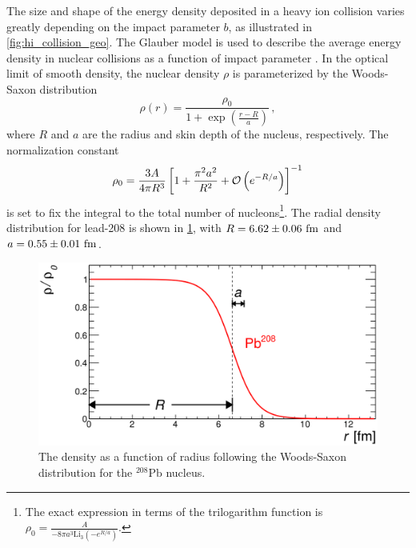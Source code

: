The size and shape of the energy density deposited in a heavy ion collision varies greatly depending on the impact parameter $b$, as illustrated in \cref{fig:hi_collision_geo}.
The Glauber model is used to describe the average energy density in nuclear collisions as a function of impact parameter \cite{Miller:2007ri}.
In the optical limit of smooth density, the nuclear density $\rho$ is parameterized by the Woods-Saxon distribution
\begin{equation}
\rho(r) = \frac{\rho_0}{1 + \exp\left( \frac{r-R}{a} \right)} \, ,
\end{equation}
where $R$ and $a$ are the radius and skin depth of the nucleus, respectively.
The normalization constant \[\rho_0 = \frac{3A}{4 \pi R^3} \left[1 + \frac{\pi^2 a^2}{R^2}  + \mathcal{O}\left( e^{-R/a} \right)\right]^{-1}\] is set to fix the integral to the total number of nucleons\footnote{The exact expression in terms of the trilogarithm function is \( \rho_0 = \frac{A}{-8\pi a^3 \mathrm{Li}_3\left( -e^{R/a} \right)} \).}.
The radial density distribution for lead-208 is shown in \cref{fig:woods_saxon}, with $R = 6.62 \pm 0.06~\mathrm{fm}$ and $a = 0.55 \pm 0.01~\mathrm{fm}$.

\begin{figure}[t]
  \includegraphics{woods_saxon_pb208.png}
  \caption{The density as a function of radius following the Woods-Saxon distribution for the ${}^{208}\mathrm{Pb}$ nucleus.}
  \label{fig:woods_saxon}
\end{figure}

